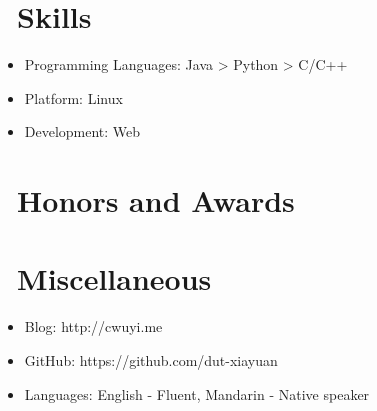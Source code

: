 \documentclass{resume}
\begin{document}

\section{\faCogs\ Skills}
\begin{itemize}[parsep=0.5ex]
  \item Programming Languages: Java > Python > C/C++
  \item Platform: Linux
  \item Development: Web
\end{itemize}

\section{\faHeartO\ Honors and Awards}

\section{\faInfo\ Miscellaneous}
\begin{itemize}[parsep=0.5ex]
  \item Blog: http://cwuyi.me
  \item GitHub: https://github.com/dut-xiayuan
  \item Languages: English - Fluent, Mandarin - Native speaker
\end{itemize}

%
%
\end{document}
